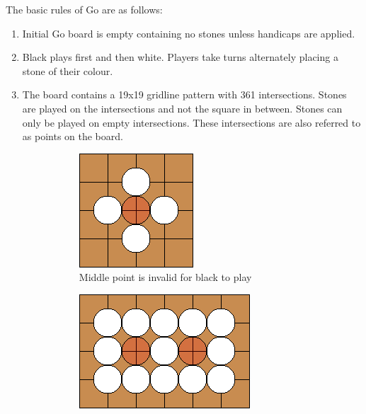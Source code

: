 \documentclass{l4proj}
\begin{document}
The basic rules of Go are as follows:
\begin{enumerate}

  \item Initial Go board is empty containing no stones unless handicaps are applied.
  \item Black plays first and then white. Players take turns alternately placing a stone of their colour.
  \item The board contains a 19x19 gridline pattern with 361 intersections. Stones are played on the intersections and not the square in between. Stones can only be played on empty intersections. These intersections are also referred to as points on the board.


  \begin{figure}[!ht]
  \centering
  \begin{subfigure}[t]{0.20\textwidth}
  \includegraphics[width=\textwidth]{ex/Ex2-0.png}
  \caption{Middle point is invalid for black to play}
  \label{fig:ex2-0}
  \end{subfigure}  \qquad\qquad
  \begin{subfigure}[t]{0.30\textwidth}
  \includegraphics[width=\textwidth]{ex/Ex2-1.png}

\end{subfigure}
\end{figure}
\end{enumerate}
\end{document}
